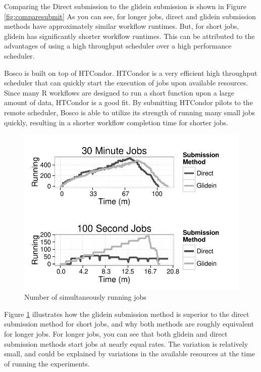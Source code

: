 Comparing the Direct submission to the glidein submission is shown in Figure \ref{fig:comparesubmit}  As you can see, for longer jobs, direct and glidein submission methods have approximately similar workflow runtimes.  But, for short jobs, glidein has significantly shorter workflow runtimes.  This can be attributed to the advantages of using a high throughput scheduler over a high performance scheduler.

Bosco is built on top of HTCondor.  HTCondor is a very efficient high throughput scheduler that can quickly start the execution of jobs upon available resources.  Since many R workflows are designed to run a short function upon a large amount of data, HTCondor is a good fit.  By submitting HTCondor pilots to the remote scheduler, Bosco is able to utilize its strength of running many small jobs quickly, resulting in a shorter workflow completion time for shorter jobs.

\begin{figure}[h!t]
\centering
\includegraphics[width=\textwidth]{BoscoRImages/NumberRunning.pdf}

\caption{Number of simultaneously running jobs}
\label{fig:runningjobs}
\end{figure}

Figure \ref{fig:runningjobs} illustrates how the glidein submission method is superior to the direct submission method for short jobs, and why both methods are roughly equivalent for longer jobs.  For longer jobs, you can see that both glidein and direct submission methods start jobs at nearly equal rates.  The variation is relatively small, and could be explained by variations in the available resources at the time of running the experiments. 

